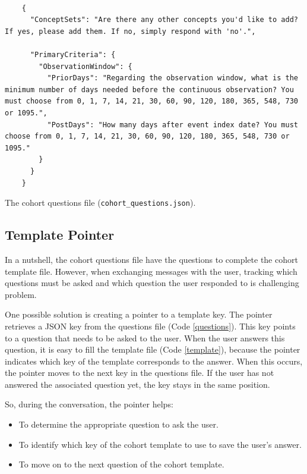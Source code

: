 \begin{listing}[H]
  \begin{verbatim}
      
    {
      "ConceptSets": "Are there any other concepts you'd like to add? If yes, please add them. If no, simply respond with 'no'.",
    
      "PrimaryCriteria": {
        "ObservationWindow": {
          "PriorDays": "Regarding the observation window, what is the minimum number of days needed before the continuous observation? You must choose from 0, 1, 7, 14, 21, 30, 60, 90, 120, 180, 365, 548, 730 or 1095.",
          "PostDays": "How many days after event index date? You must choose from 0, 1, 7, 14, 21, 30, 60, 90, 120, 180, 365, 548, 730 or 1095."
        }
      }
    }

  \end{verbatim}
  \caption{The cohort questions file {\small\normalfont(\texttt{cohort\_questions.json})}.}
  \label{questions}
\end{listing}



\subsection{Template Pointer}

In a nutshell, the cohort questions file have the questions to complete the cohort template file. However, when exchanging messages with the user, tracking which questions must be asked and which question the user responded to is challenging problem.

One possible solution is creating a pointer to a template key. The pointer retrieves a JSON key from the questions file (Code \ref{questions}). This key points to a question that needs to be asked to the user. When the user answers this question, it is easy to fill the template file (Code \ref{template}), because the pointer indicates which key of the template corresponds to the answer. When this occurs, the pointer moves to the next key in the questions file. If the user has not answered the associated question yet, the key stays in the same position.

So, during the conversation, the pointer helps:

\begin{itemize}
  \item To determine the appropriate question to ask the user.
  \item To identify which key of the cohort template to use to save the user's answer.
  \item To move on to the next question of the cohort template.
\end{itemize}

